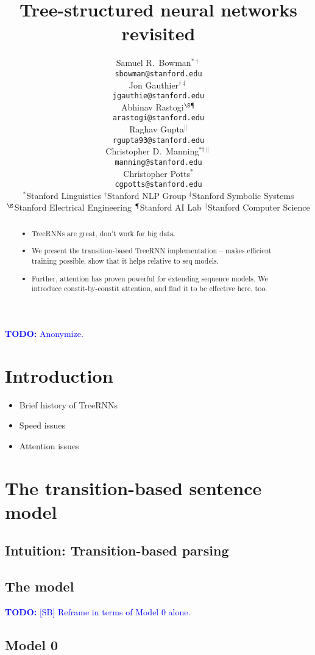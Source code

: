 \documentclass[11pt,letterpaper]{article}
\title{Tree-structured neural networks revisited}
\author{
Samuel R.\ Bowman$^{\ast\dag}$ \\
\texttt{sbowman@stanford.edu} \\
\And
Jon Gauthier$^{\dag\ddag}$ \\
\texttt{jgauthie@stanford.edu} \\
\And
Abhinav Rastogi$^{\S\mathparagraph}$ \\
\texttt{arastogi@stanford.edu} \\
\AND
Raghav Gupta$^{\parallel}$ \\
\texttt{rgupta93@stanford.edu} \\
\And
Christopher D.\ Manning$^{\ast\dag\parallel}$\\
\texttt{manning@stanford.edu}\\
\And
Christopher Potts$^{\ast}$\\
\texttt{cgpotts@stanford.edu}
\AND\\[-3ex]
{$^{\ast}$Stanford Linguistics\quad
$^{\dag}$Stanford NLP Group\quad
$^{\ddag}$Stanford Symbolic Systems}\\
{$^{\S}$Stanford Electrical Engineering\quad
$^{\mathparagraph}$Stanford AI Lab\quad
$^{\parallel}$Stanford Computer Science}
}
\date{}
\newcommand\todo[1]{\textcolor{blue}{\textbf{TODO:} #1}}
\begin{document}
\maketitle
\begin{abstract}
\begin{itemize}
\item TreeRNNs are great, don't work for big data.
\item We present the transition-based TreeRNN implementation -- makes efficient training possible, show that it helps relative to seq models.
\item Further, attention has proven powerful for extending sequence models. We introduce constit-by-constit attention, and find it to be effective here, too.
\end{itemize}
\end{abstract}

\todo{Anonymize.}

\section{Introduction}

\begin{itemize}
\item Brief history of TreeRNNs
\item Speed issues
\item Attention issues
\end{itemize}

\section{The transition-based sentence model}

\subsection{Intuition: Transition-based parsing}

\subsection{The model}

\todo{[SB] Reframe in terms of Model 0 alone.}


\subsection{Model 0}
\end{document}
